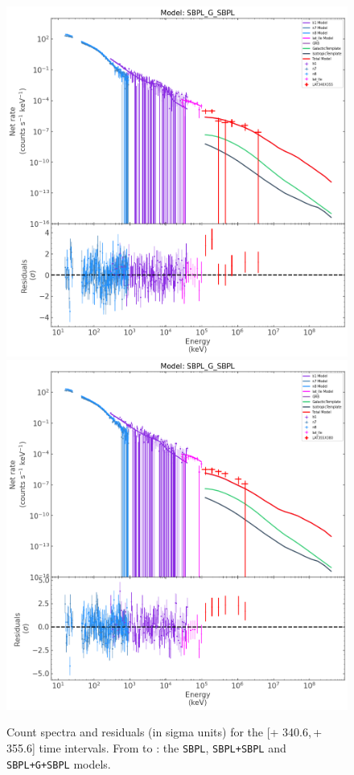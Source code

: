 \documentclass[preprint]{aastex631}
\begin{document}
\begin{figure}[t]
    \includegraphics[width=0.4\linewidth]{best_spectrum_340p61-355p61_SBPL_G_SBPL.png}
    \includegraphics[width=0.4\linewidth]{best_spectrum_355p61-380p61_SBPL_G_SBPL.png}
\caption{Count spectra  and residuals (in sigma units) for the [\trig+ 340.6,\,\trig+ 355.6]   time intervals. From  to : the \texttt{SBPL}, \texttt{SBPL+SBPL} and \texttt{SBPL+G+SBPL} models.}

    \label{fig:interval56}
\end{figure}
\end{document}
